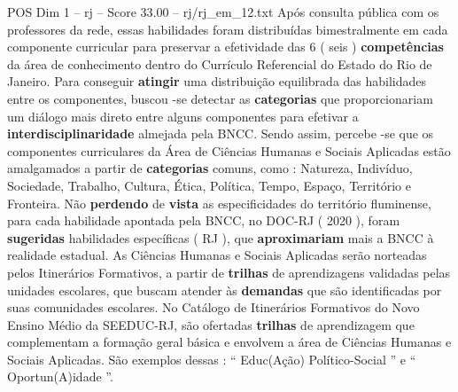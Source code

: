\begin{textsample}{POS Dim 1 – rj – Score 33.00 – rj/rj\_em\_12.txt}
Após consulta pública com os professores da rede, essas habilidades foram distribuídas bimestralmente em cada componente curricular para preservar a efetividade das 6 ( seis ) \textbf{competências} da área de conhecimento dentro do Currículo Referencial do Estado do Rio de Janeiro.
Para conseguir \textbf{atingir} uma distribuição equilibrada das habilidades entre os componentes, buscou -se detectar as \textbf{categorias} que proporcionariam um diálogo mais direto entre alguns componentes para efetivar a \textbf{interdisciplinaridade} almejada pela BNCC.
Sendo assim, percebe -se que os componentes curriculares da Área de Ciências Humanas e Sociais Aplicadas estão amalgamados a partir de \textbf{categorias} comuns, como : Natureza, Indivíduo, Sociedade, Trabalho, Cultura, Ética, Política, Tempo, Espaço, Território e Fronteira.
Não \textbf{perdendo} de \textbf{vista} as especificidades do território fluminense, para cada habilidade apontada pela BNCC, no DOC-RJ ( 2020 ), foram \textbf{sugeridas} habilidades específicas ( RJ ), que \textbf{aproximariam} mais a BNCC à realidade estadual.
As Ciências Humanas e Sociais Aplicadas serão norteadas pelos Itinerários Formativos, a partir de \textbf{trilhas} de aprendizagens validadas pelas unidades escolares, que buscam atender às \textbf{demandas} que são identificadas por suas comunidades escolares.
No Catálogo de Itinerários Formativos do Novo Ensino Médio da SEEDUC-RJ, são ofertadas \textbf{trilhas} de aprendizagem que complementam a formação geral básica e envolvem a área de Ciências Humanas e Sociais Aplicadas.
São exemplos dessas : “ Educ(Ação) Político-Social ” e “ Oportun(A)idade ”.

\end{textsample}
